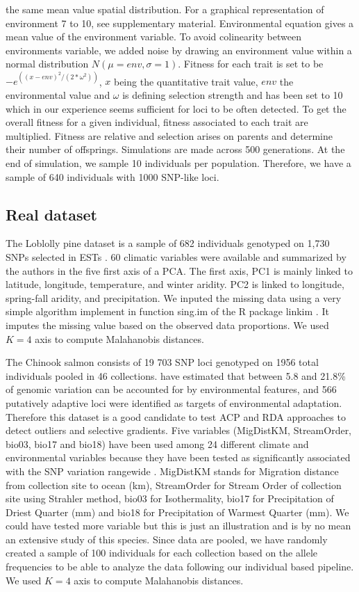 \documentclass[nogrid]{MBE}%
\begin{document}
the same mean value spatial distribution. For a graphical representation of environment 7 to 10, see supplementary material. Environmental equation gives a mean value of the environment variable. To avoid colinearity between environments variable, we added noise by drawing an environment value within a normal distribution $N(\mu=env, \sigma=1)$. Fitness for each trait is set to be $-e^{((x-env)^2/(2*\omega^2))}$, $x$ being the quantitative trait value, $env$ the environmental value and $\omega$ is defining selection strength and has been set to 10 which in our experience seems sufficient for loci to be often detected. To get the overall fitness for a given individual, fitness associated to each trait are multiplied. Fitness are relative and selection arises on parents and determine their number of offsprings. Simulations are made across 500 generations. At the end of simulation, we sample 10 individuals per population. Therefore, we have a sample of 640 individuals with 1000 SNP-like loci.

\subsection{Real dataset}
The Loblolly pine dataset is a sample of 682 individuals genotyped on 1,730 SNPs selected in ESTs \citep{Eckert2010}. 60 climatic variables were available and summarized by the authors in the five first axis of a PCA. The first axis, PC1 is mainly linked to latitude, longitude, temperature, and winter aridity. PC2 is linked to longitude, spring-fall aridity, and precipitation. We inputed the missing data using a very simple algorithm implement in function sing.im of the R package linkim \citep{Lachenbruch2011}. It imputes the missing value based on the observed data proportions.  We used $K=4$ axis to compute Malahanobis distances.

The Chinook salmon consists of 19 703 SNP loci genotyped on 1956 total individuals pooled in 46 collections. \citet{Hecht2015} have estimated that between 5.8 and 21.8\% of genomic variation can be accounted for by environmental features, and 566 putatively adaptive loci were identified as targets of environmental adaptation. Therefore this dataset is a good candidate to test ACP and RDA approaches to detect outliers and selective gradients. Five variables (MigDistKM, StreamOrder, bio03, bio17 and bio18) have been used among  24 different climate and environmental variables because they have been tested as significantly associated with the SNP variation rangewide \citep{Hecht2015}. MigDistKM stands for Migration distance from collection site to ocean (km),
StreamOrder for Stream Order of collection site using Strahler method, bio03 for Isothermality, bio17 for Precipitation of Driest Quarter (mm) and bio18 for Precipitation of Warmest Quarter (mm). We could have tested more variable but this is just an illustration and is by no mean an extensive study of this species. Since data are pooled, we have randomly created a sample of 100 individuals for each collection based on the allele frequencies to be able to analyze the data following our individual based pipeline. We used $K=4$ axis to compute Malahanobis distances.
\end{document}
